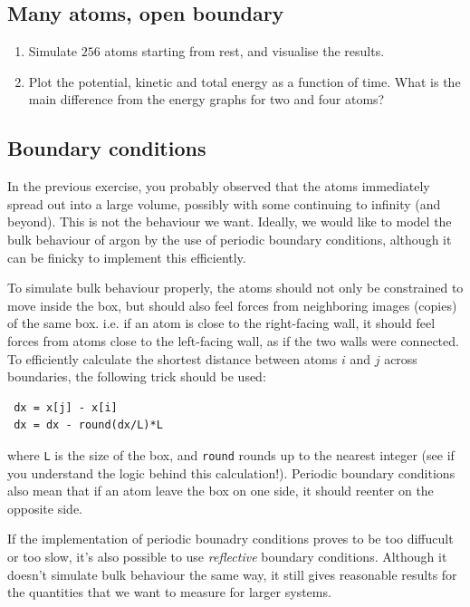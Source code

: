 \documentclass[11pt,british,a4paper]{report}
\begin{document}
\subsection{Many atoms, open boundary}
\begin{enumerate}[label=\roman*.]
    \item Simulate \(256\) atoms starting from rest, and visualise the results.
    \item Plot the potential, kinetic and total energy as a function of time. What is the main difference from the energy graphs for two and four atoms?
\end{enumerate}

\subsection{Boundary conditions}
In the previous exercise, you probably observed that the atoms immediately spread out into a large volume, possibly with some continuing to infinity (and beyond). This is not the behaviour we want. Ideally, we would like to model the bulk behaviour of argon by the use of periodic boundary conditions, although it can be finicky to implement this efficiently.

To simulate bulk behaviour properly, the atoms should not only be constrained to move inside the box, but should also feel forces from neighboring images (copies) of the same box. i.e. if an atom is close to the right-facing wall, it should feel forces from atoms close to the left-facing wall, as if the two walls were connected.
To efficiently calculate the shortest distance between atoms $i$ and $j$ across boundaries, the following trick should be used:


\begin{lstlisting}
 dx = x[j] - x[i]
 dx = dx - round(dx/L)*L
\end{lstlisting}

where \texttt{L} is the size of the box, and \texttt{round} rounds up to the nearest integer (see if you understand the logic behind this calculation!). Periodic boundary conditions also mean that if an atom leave the box on one side, it should reenter on the opposite side. 

If the implementation of periodic bounadry conditions proves to be too diffucult or too slow, it's also possible to use \textit{reflective} boundary conditions. Although it doesn't simulate bulk behaviour the same way, it still gives reasonable results for the quantities that we want to measure for larger systems.
\end{document}
